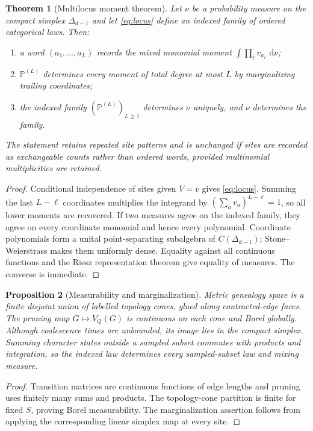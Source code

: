 \documentclass[11pt]{article}
\newtheorem{theorem}{Theorem}[section]
\newtheorem{proposition}[theorem]{Proposition}
\newcommand{\dd}{\,\mathrm d}
\begin{document}
\begin{theorem}[Multilocus moment theorem]
\label{thm:moment}
Let $\nu$ be a probability measure on the compact simplex $\Delta_{d-1}$ and let \eqref{eq:locus} define an indexed family of ordered categorical laws.  Then:
\begin{enumerate}[label=(\roman*)]
\item a word $(a_1,\ldots,a_L)$ records the mixed monomial moment $\int\prod_\ell v_{a_\ell}\,\dd\nu$;
\item $\mathbb P^{(L)}$ determines every moment of total degree at most $L$ by marginalizing trailing coordinates;
\item the indexed family $(\mathbb P^{(L)})_{L\ge1}$ determines $\nu$ uniquely, and $\nu$ determines the family.
\end{enumerate}
The statement retains repeated site patterns and is unchanged if sites are recorded as exchangeable counts rather than ordered words, provided multinomial multiplicities are retained.
\end{theorem}

\begin{proof}
Conditional independence of sites given $V=v$ gives \eqref{eq:locus}.  Summing the last $L-\ell$ coordinates multiplies the integrand by $(\sum_a v_a)^{L-\ell}=1$, so all lower moments are recovered.  If two measures agree on the indexed family, they agree on every coordinate monomial and hence every polynomial.  Coordinate polynomials form a unital point-separating subalgebra of $C(\Delta_{d-1})$; Stone--Weierstrass makes them uniformly dense.  Equality against all continuous functions and the Riesz representation theorem give equality of measures.  The converse is immediate.
\end{proof}

\begin{proposition}[Measurability and marginalization]
\label{prop:measurable}
Metric genealogy space is a finite disjoint union of labelled topology cones, glued along contracted-edge faces.  The pruning map $G\mapsto V_Q(G)$ is continuous on each cone and Borel globally.  Although coalescence times are unbounded, its image lies in the compact simplex.  Summing character states outside a sampled subset commutes with products and integration, so the indexed law determines every sampled-subset law and mixing measure.
\end{proposition}

\begin{proof}
Transition matrices are continuous functions of edge lengths and pruning uses finitely many sums and products.  The topology-cone partition is finite for fixed $S$, proving Borel measurability.  The marginalization assertion follows from applying the corresponding linear simplex map at every site.
\end{proof}
\end{document}
